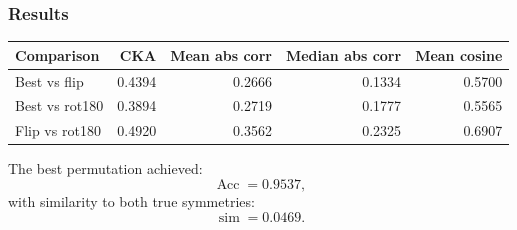 \subsubsection{Results}

\begin{center}
\begin{tabular}{lrrrr}
\toprule
Comparison & CKA & Mean abs corr & Median abs corr & Mean cosine \\
\midrule
Best vs flip & 0.4394 & 0.2666 & 0.1334 & 0.5700 \\
Best vs rot180 & 0.3894 & 0.2719 & 0.1777 & 0.5565 \\
Flip vs rot180 & 0.4920 & 0.3562 & 0.2325 & 0.6907 \\
\bottomrule
\end{tabular}
\end{center}

The best permutation achieved:
\[
\operatorname{Acc}=0.9537,
\]
with similarity to both true symmetries:
\[
\operatorname{sim}=0.0469.
\]
